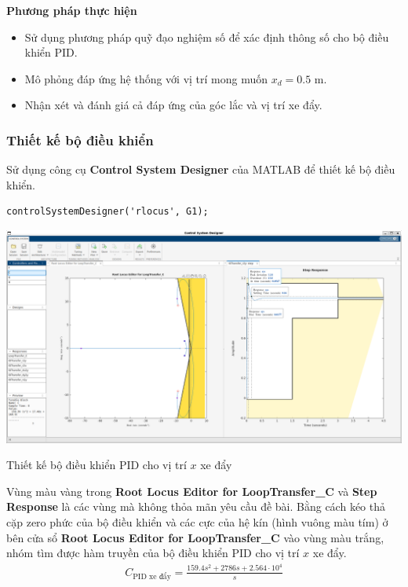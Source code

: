 \documentclass[12pt,a4paper]{article}
\begin{document}
\vspace{\baselineskip}

\begin{minipage}[t]{0.3\linewidth}
    \textbf{Phương pháp thực hiện}
\end{minipage}\begin{minipage}[t]{0.6\linewidth}
    \begin{itemize}[noitemsep,topsep=0pt]
        \item Sử dụng phương pháp quỹ đạo nghiệm số để xác định thông số cho bộ điều khiển PID.
        \item Mô phỏng đáp ứng hệ thống với vị trí mong muốn $x_d = 0.5$ m.
        \item Nhận xét và đánh giá cả đáp ứng của góc lắc và vị trí xe đẩy.
    \end{itemize}
\end{minipage}

\subsubsection{Thiết kế bộ điều khiển}

Sử dụng công cụ \textbf{Control System Designer} của MATLAB để thiết kế bộ điều khiển. 
\begin{lstlisting}[style=matlabstyle,caption=Thiết kế bộ điều khiển PID cho hàm truyền $G_2(s)$]
controlSystemDesigner('rlocus', G1);
\end{lstlisting}


\begin{center}
    \captionsetup{type=figure}
    \includegraphics[width=\linewidth]{thiet_ke_PID_xe_day.png}
    \caption{Thiết kế bộ điều khiển PID cho vị trí $x$ xe đẩy}
\end{center}

Vùng màu vàng trong \textbf{Root Locus Editor for LoopTransfer\_C} và  \textbf{Step Response} là các vùng mà không thỏa mãn yêu cầu đề bài. Bằng cách kéo thả cặp zero phức của bộ điều khiển và các cực của hệ kín (hình vuông màu tím) ở bên cửa sổ \textbf{Root Locus Editor for LoopTransfer\_C} vào vùng màu trắng, nhóm tìm được hàm truyền của bộ điều khiển PID cho vị trí $x$ xe đẩy.
\begin{align}
    C_{\text{PID xe đẩy}} = \frac{159.4 s^2 + 2786 s + 2.564\cdot 10^4}{s}
\end{align}
\end{document}
